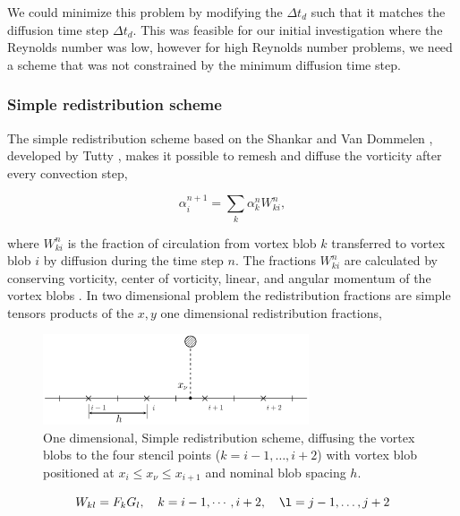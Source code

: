 We could minimize this problem by modifying the $\Delta t_d$ such that it matches the diffusion time step $\Delta t_d$. This was feasible for our initial investigation where the Reynolds number was low, however for high Reynolds number problems, we need a scheme that was not constrained by the minimum diffusion time step.

\subsubsection*{Simple redistribution scheme}

The simple redistribution scheme based on the Shankar and Van Dommelen \cite{Shankar1996}, developed by Tutty \cite{2010arXiv1009.0166T}, makes it possible to remesh and diffuse the vorticity after every convection step, 

	\begin{equation}
	\alpha_i^{n+1} = \sum_k \alpha_k^n W_{ki}^n, 
	\end{equation}

where $W_{ki}^n$ is the fraction of circulation from vortex blob $k$ transferred to vortex blob $i$ by diffusion during the time step $n$. The fractions $W_{ki}^n$ are calculated by conserving vorticity, center of vorticity, linear, and angular momentum of the vortex blobs \cite{2010arXiv1009.0166T}. In two dimensional problem the redistribution fractions are simple tensors products of the $x,y$ one dimensional redistribution fractions,


	\begin{figure}[!b]
	\centering
	\includegraphics[width=0.7\textwidth]{figures/lagrangian/simpleRedistribution.pdf}
	\caption{One dimensional, Simple redistribution scheme, diffusing the vortex blobs to the four stencil points ($k=i-1,\dots,i+2$) with vortex blob positioned at $x_i \le x_{\nu} \le x_{i+1}$ and nominal blob spacing $h$.}
	\label{fig:simpleRedistribution}
	\end{figure}

	\begin{equation}
	W_{kl} = F_k G_l, \quad k = i-1,\cdots,i+2, \quad \l = j-1,\dots,j+2
	\end{equation}

